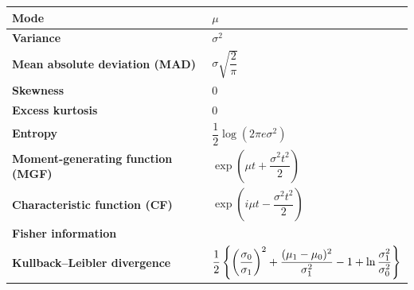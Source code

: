 \begin{customTableWrapper}{2}
\begin{longtable}{|m{6cm}|p{9cm}|}
    \textbf{Mode} & 
    $\mu$
    \\ \hline

    \textbf{Variance} &
    $\sigma^2$
    \\ \hline

    \textbf{Mean absolute deviation (MAD)} &
    ${\displaystyle \sigma {\sqrt {\dfrac{2}{\pi} }}}$ 
    \\[1ex] \hline

    \textbf{Skewness} &
    $0$ 
    \\ \hline

    \textbf{Excess kurtosis} &
    $0$ 
    \\ \hline

    \textbf{Entropy} &
    ${\displaystyle {\dfrac {1}{2}}\log(2\pi e\sigma ^{2})}$
    \\[1ex] \hline

    \textbf{Moment-generating function (MGF)} &
    ${\displaystyle \exp(\mu t+\dfrac{\sigma ^{2}t^{2}}{2})}$
    \\[1ex] \hline

    \textbf{Characteristic function (CF)} &
    ${\displaystyle \exp(i\mu t-\dfrac{\sigma ^{2}t^{2}}{2})}$
    \\[1ex] \hline

    \textbf{Fisher information} &
    \tableenumerate{
        \item ${\displaystyle {\mathcal {I}}(\mu ,\sigma )={\begin{pmatrix}1/\sigma ^{2}&0\\0&2/\sigma ^{2}\end{pmatrix}}}$
        \vspace{0.1cm}

        \item ${\displaystyle {\mathcal {I}}(\mu ,\sigma ^{2})={\begin{pmatrix}1/\sigma ^{2}&0\\0&1/(2\sigma ^{4})\end{pmatrix}}}$
        \vspace{0.1cm}
    }
    \\[1ex] \hline

    \textbf{Kullback–Leibler divergence} &
    ${\displaystyle {1 \over 2}\left\{\left({\frac {\sigma _{0}}{\sigma _{1}}}\right)^{2}+{\frac {(\mu _{1}-\mu _{0})^{2}}{\sigma _{1}^{2}}}-1+\ln {\sigma _{1}^{2} \over \sigma _{0}^{2}}\right\}}$
    \\[2ex] \hline

\end{longtable}
\end{customTableWrapper}












